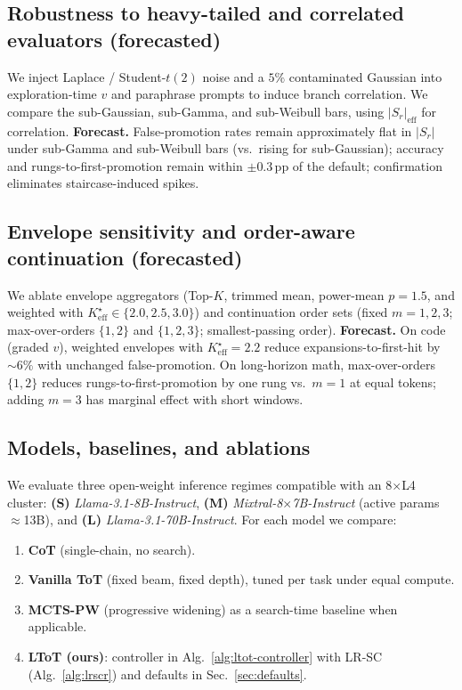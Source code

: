 \documentclass{article}
\begin{document}
\subsection{Robustness to heavy-tailed and correlated evaluators (forecasted)}
\label{subsec:robustness}
We inject Laplace / Student-$t(2)$ noise and a $5\%$ contaminated Gaussian into exploration-time $v$ and paraphrase prompts to induce branch correlation.
We compare the sub-Gaussian, sub-Gamma, and sub-Weibull bars, using $|S_r|_{\mathrm{eff}}$ for correlation.
\textbf{Forecast.} False-promotion rates remain approximately flat in $|S_r|$ under sub-Gamma and sub-Weibull bars (vs.\ rising for sub-Gaussian);
accuracy and rungs-to-first-promotion remain within $\pm 0.3$\,pp of the default; confirmation eliminates staircase-induced spikes.

\subsection{Envelope sensitivity and order-aware continuation (forecasted)}
\label{subsec:ablations}
We ablate envelope aggregators (Top-$K$, trimmed mean, power-mean $p{=}1.5$, and weighted with $K_{\mathrm{eff}}^\star\!\in\!\{2.0,2.5,3.0\}$)
and continuation order sets (fixed $m{=}1,2,3$; max-over-orders $\{1,2\}$ and $\{1,2,3\}$; smallest-passing order).
\textbf{Forecast.} On code (graded $v$), weighted envelopes with $K_{\mathrm{eff}}^\star{=}2.2$ reduce expansions-to-first-hit by $\sim\!6\%$ with unchanged false-promotion.
On long-horizon math, max-over-orders $\{1,2\}$ reduces rungs-to-first-promotion by one rung vs.\ $m{=}1$ at equal tokens; adding $m{=}3$ has marginal effect with short windows.
\subsection{Models, baselines, and ablations}
\label{subsec:baselines}
We evaluate three open-weight inference regimes compatible with an 8$\times$L4 cluster:
\textbf{(S)} \emph{Llama-3.1-8B-Instruct},
\textbf{(M)} \emph{Mixtral-8$\times$7B-Instruct} (active params $\approx$13B), and
\textbf{(L)} \emph{Llama-3.1-70B-Instruct}.
For each model we compare:

\begin{enumerate}[leftmargin=*, itemsep=2pt, topsep=2pt]
    \item \textbf{CoT} (single-chain, no search).
    \item \textbf{Vanilla ToT} (fixed beam, fixed depth), tuned per task under equal compute.
    \item \textbf{MCTS-PW} (progressive widening) as a search-time baseline when applicable.
    \item \textbf{LToT (ours)}: controller in Alg.~\ref{alg:ltot-controller} with LR-SC (Alg.~\ref{alg:lrscr}) and defaults in Sec.~\ref{sec:defaults}.
\end{enumerate}
\end{document}
